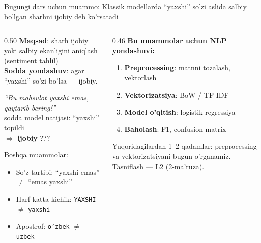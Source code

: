 \documentclass[aspectratio=169,11pt]{beamer}
\begin{document}
\begin{frame}{Bugungi dars uchun muammo: Klassik modellarda ``yaxshi'' so'zi aslida salbiy bo'lgan sharhni ijobiy deb ko'rsatadi}
  \begin{columns}[T]
    \begin{column}{0.50\textwidth}
      \textbf{Maqsad}: sharh ijobiy yoki salbiy ekanligini aniqlash (sentiment tahlil)\\[5pt]
      \textbf{Sodda yondashuv}: agar ``yaxshi'' so'zi bo'lsa --- ijobiy.\\[5pt]
      \begin{tcolorbox}[warnbox,title=Natija xato!,top=2pt,bottom=2pt]
        \small
        \textit{``Bu mahsulot \underline{yaxshi} emas,}\\
        \textit{qaytarib bering!''}\\[3pt]
        sodda model natijasi: ``yaxshi'' topildi\\
        $\Rightarrow$ \textbf{ijobiy} \hfill\alert{???}
      \end{tcolorbox}
      \vspace{4pt}
      \footnotesize Boshqa muammolar:
      \begin{itemize}\setlength\itemsep{1pt}
        \item So'z tartibi: ``yaxshi emas'' $\ne$ ``emas yaxshi''
        \item Harf katta-kichik: \texttt{YAXSHI} $\ne$ \texttt{yaxshi}
        \item Apostrof: \texttt{o'zbek} $\ne$ \texttt{uzbek}
      \end{itemize}
    \end{column}
    \begin{column}{0.46\textwidth}
      \textbf{Bu muammolar uchun NLP yondashuvi:}\\[4pt]
      \begin{enumerate}\small\setlength\itemsep{4pt}
        \item \textbf{Preprocessing}: matnni tozalash, vektorlash
        \item \textbf{Vektorizatsiya}: BoW / TF-IDF 
        \item \textbf{Model o'qitish}: logistik regressiya
        \item \textbf{Baholash}: F1, confusion matrix
      \end{enumerate}
      \vspace{5pt}
      \begin{tcolorbox}[okbox,title=Bugun o'rganamiz,top=2pt,bottom=2pt]
        \footnotesize
        Yuqoridagilardan 1--2 qadamlar: preprocessing va
        vektorizatsiyani bugun o'rganamiz. Tasniflash ---
        L2 (2-ma'ruza).
      \end{tcolorbox}
    \end{column}
  \end{columns}
\end{frame}
\end{document}
